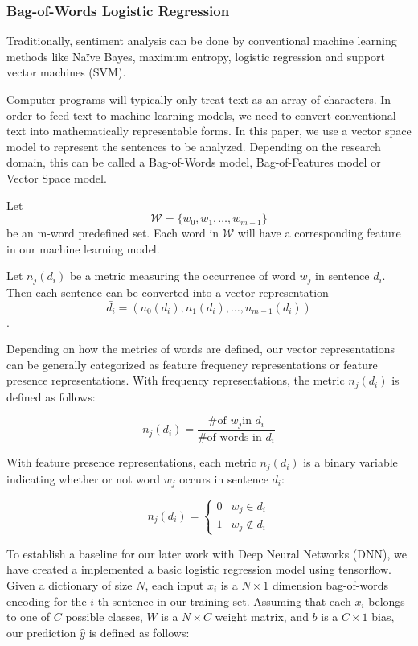 \documentclass[conference]{IEEEtran}
\begin{document}
\subsubsection{Bag-of-Words Logistic Regression}
\label{model:core:bow}
    Traditionally, sentiment analysis can be done by conventional machine learning
    methods like Na\"ive Bayes, maximum entropy, logistic regression and 
    support vector machines (SVM). 
    
    Computer programs will typically only treat text as an array of characters.
    In order to feed text to machine learning models, we need to 
    convert conventional text into mathematically representable forms. In this
    paper, we use a vector space model to represent the sentences to be analyzed.
    Depending on the research domain, this can be called a Bag-of-Words model, 
    Bag-of-Features model or Vector Space model\cite{salton1975vector}.
    
    Let $$\mathcal{W}=\{w_0, w_1,\ldots, w_{m-1}\}$$ be an m-word predefined set. Each 
    word in $\mathcal{W}$ will have a corresponding feature in our machine learning model.
    
    Let $n_j(d_i)$ be a metric measuring the occurrence of word $w_j$
    in sentence $d_i$. Then each sentence can be converted into a vector representation 
    $$\bar{d_i}=(n_0(d_i),n_1(d_i),\ldots,n_{m-1}(d_i))$$.
    
    Depending on how the metrics of words are defined, our vector representations can be
    generally categorized as feature frequency representations or feature presence
    representations\cite{pang2002thumbs}. With frequency representations, the metric 
    $n_j(d_i)$ is defined as follows: 
     
    $$n_j(d_i) = \frac{\text{\# of }w_j \text{in } d_i}{\text{\# of words in } d_i}$$

    With feature presence representations, each metric $n_j(d_i)$ is a binary
    variable indicating whether or not word $w_j$ occurs in sentence $d_i$:
     
    $$n_j(d_i) = \begin{cases} 
        0 & w_j \in d_i\\
        1 & w_j \notin d_i
    \end{cases}$$
    
    To establish a baseline for our later work with Deep Neural Networks (DNN), we have
    created a implemented a basic logistic regression model using tensorflow. Given a 
    dictionary of size $N$, each input $x_i$ is a $N \times 1$ dimension bag-of-words encoding
    for the $i$-th sentence in our training set. Assuming that each $x_i$ belongs to one of $C$
    possible classes, $W$ is a $N \times C$ weight matrix, and $b$ is a $C \times 1$ bias,
    our prediction $\hat{y}$ is defined as follows:
        
\end{document}
